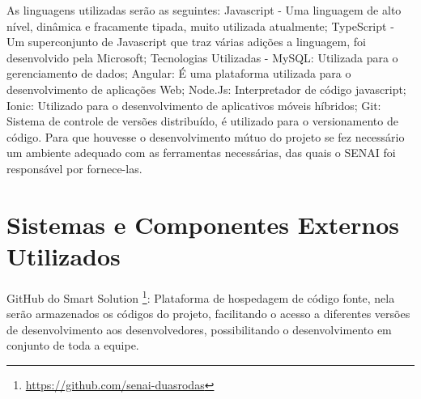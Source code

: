 As linguagens utilizadas serão as seguintes: Javascript - Uma linguagem de alto nível, dinâmica e fracamente tipada, muito utilizada atualmente; TypeScript - Um superconjunto de Javascript que traz várias adições a linguagem, foi desenvolvido pela Microsoft; Tecnologias Utilizadas - MySQL: Utilizada para o gerenciamento de dados; Angular: É uma plataforma utilizada para o desenvolvimento de aplicações Web; Node.Js: Interpretador de código javascript; Ionic: Utilizado para o desenvolvimento de aplicativos móveis híbridos; Git: Sistema de controle de versões distribuído, é utilizado para o versionamento de código. Para que houvesse o desenvolvimento mútuo do projeto se fez necessário um ambiente adequado com as ferramentas necessárias, das quais o SENAI foi responsável por fornece-las.
\newpage

\section{Sistemas e Componentes Externos Utilizados}

GitHub do Smart Solution \footnote{\url{https://github.com/senai-duasrodas}}: Plataforma de hospedagem de código fonte, nela serão armazenados os códigos do projeto, facilitando o acesso a diferentes versões de desenvolvimento aos desenvolvedores, possibilitando o desenvolvimento em conjunto de toda a equipe.

\newpage


